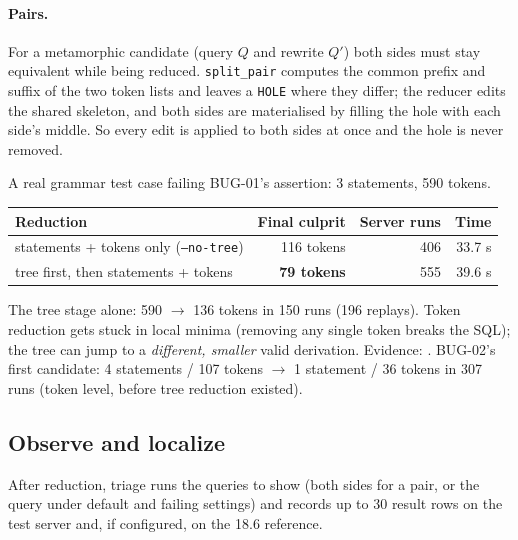 \paragraph{Pairs.} For a metamorphic candidate (query $Q$ and rewrite $Q'$)
both sides must stay equivalent while being reduced. \texttt{split\_pair}
computes the common prefix and suffix of the two token lists and leaves a
\texttt{HOLE} where they differ; the reducer edits the shared skeleton, and both
sides are materialised by filling the hole with each side's middle. So every
edit is applied to both sides at once and the hole is never removed.

\begin{keybox}
A real grammar test case failing BUG-01's assertion: 3 statements, 590 tokens.
\begin{center}
\begin{tabular}{lrrr}
\toprule
Reduction & Final culprit & Server runs & Time \\
\midrule
statements + tokens only (\texttt{--no-tree}) & 116 tokens & 406 & 33.7 s \\
tree first, then statements + tokens & \textbf{79 tokens} & 555 & 39.6 s \\
\bottomrule
\end{tabular}
\end{center}
The tree stage alone: 590 $\rightarrow$ 136 tokens in 150 runs (196 replays).
Token reduction gets stuck in local minima (removing any single token breaks
the SQL); the tree can jump to a \emph{different, smaller} valid derivation.
Evidence: . BUG-02's first candidate:
4 statements / 107 tokens $\rightarrow$ 1 statement / 36 tokens in 307 runs
(token level, before tree reduction existed).
\end{keybox}

\subsection{Observe and localize}
\label{sec:localize}

After reduction, triage runs the queries to show (both sides for a pair, or
the query under default and failing settings) and records up to 30 result rows
on the test server and, if configured, on the 18.6 reference.

